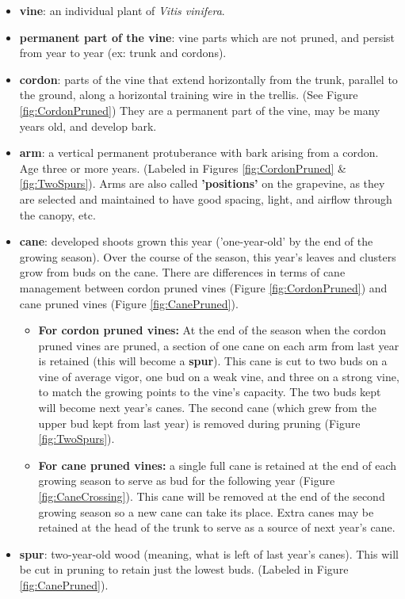 \documentclass[11pt,letter]{article}
\newenvironment{smitemize}{
\begin{itemize}
  \setlength{\itemsep}{0pt}
  \setlength{\parskip}{0.8pt}
  \setlength{\parsep}{0pt}}
{\end{itemize}
}
\begin{document}
\begin{smitemize}
\item {\bf vine}: an individual plant of \emph{Vitis vinifera}. 
\item {\bf permanent part of the vine}: vine parts which are not pruned, and persist from year to year (ex: trunk and cordons).
\item {\bf cordon}: parts of the vine that extend horizontally from the trunk, parallel to the ground, along a horizontal training wire in the trellis. (See Figure \ref{fig:CordonPruned}) They are a permanent part of the vine, may be many years old, and develop bark. 
\item {\bf arm}: a vertical permanent protuberance with bark arising from a cordon. Age three or more years. (Labeled in Figures \ref{fig:CordonPruned} \& \ref{fig:TwoSpurs}). Arms are also called {\bf 'positions'} on the grapevine, as they are selected and maintained to have good spacing, light, and airflow through the canopy, etc. 
\item {\bf cane}: developed shoots grown this year ('one-year-old' by the end of the growing season). Over the course of the season, this year's leaves and clusters grow from buds on the cane. There are differences in terms of cane management between cordon pruned vines (Figure \ref{fig:CordonPruned}) and cane pruned vines (Figure \ref{fig:CanePruned}).
\begin{smitemize}
\item {\bf For cordon pruned vines:} At the end of the season when the cordon pruned vines are pruned, a section of one cane on each arm from last year is retained (this will become a {\bf spur}). This cane is cut to two buds on a vine of average vigor, one bud on a weak vine, and three on a strong vine, to match the growing points to the vine's capacity. The two buds kept will become next year's canes. The second cane (which grew from the upper bud kept from last year) is removed during pruning (Figure \ref{fig:TwoSpurs}). 
\item {\bf For cane pruned vines:} a single full cane is retained at the end of each growing season to serve as bud for the following year (Figure \ref{fig:CaneCrossing}). This cane will be removed at the end of the second growing season so a new cane can take its place. Extra canes may be retained at the head of the trunk to serve as a source of next year's cane. 
\end{smitemize}
\item {\bf spur}: two-year-old wood (meaning, what is left of last year's canes). This will be cut in pruning to retain just the lowest buds. (Labeled in Figure \ref{fig:CanePruned}).

\end{smitemize}
\end{document}
